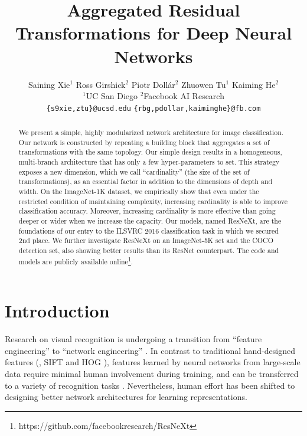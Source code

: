 \documentclass[10pt,twocolumn,letterpaper]{article}
\begin{document}
\title{Aggregated Residual Transformations for Deep Neural Networks}

\author{
Saining Xie$^1$
\qquad
Ross Girshick$^2$
\qquad
Piotr Doll\'ar$^2$
\qquad
Zhuowen Tu$^1$
\qquad
Kaiming He$^2$
\\
$^1$UC San Diego
\qquad
$^2$Facebook AI Research\\
{\tt\small \{s9xie,ztu\}@ucsd.edu}
\qquad\quad
{\tt\small \{rbg,pdollar,kaiminghe\}@fb.com}
}

\maketitle

\begin{abstract}
\vspace{-.5em}
We present a simple, highly modularized network architecture for image classification.
Our network is constructed by repeating a building block that aggregates a set of transformations with the same topology.
Our simple design results in a homogeneous, multi-branch architecture that has only a few hyper-parameters to set. This strategy exposes a new dimension, which we call ``cardinality'' (the size of the set of transformations), as an essential factor in addition to the dimensions of depth and width. On the ImageNet-1K dataset, we empirically show that even under the restricted condition of maintaining complexity, increasing cardinality is able to improve classification accuracy. Moreover, increasing cardinality is more effective than going deeper or wider when we increase the capacity. Our models, named ResNeXt, are the foundations of our entry to the ILSVRC 2016 classification task in which we secured 2nd place.
We further investigate ResNeXt on an ImageNet-5K set and the COCO detection set, also showing better results than its ResNet counterpart. The code and models are publicly available online\footnote{https://github.com/facebookresearch/ResNeXt}.
\end{abstract}


\section{Introduction}
\label{sec:intro}

Research on visual recognition is undergoing a transition from ``feature engineering'' to ``network engineering'' \cite{LeCun1989,Krizhevsky2012,Zeiler2014,Sermanet2014,Simonyan2015,Szegedy2015,He2016}.
In contrast to traditional hand-designed features (\eg, SIFT \cite{Lowe2004} and HOG \cite{Dalal2005}), features learned by neural networks from large-scale data \cite{Russakovsky2015} require minimal human involvement during training, and can be transferred to a variety of recognition tasks \cite{Donahue2014,Girshick2014,Long2015}.
Nevertheless, human effort has been shifted to designing better network architectures for learning representations.
\end{document}
